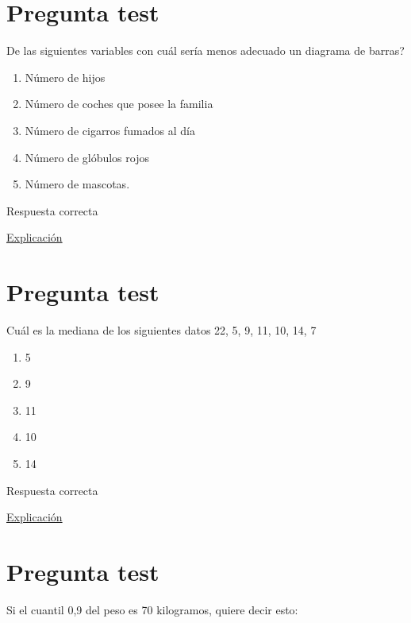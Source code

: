 \documentclass[
]{book}
\providecommand{\tightlist}{%
  \setlength{\itemsep}{0pt}\setlength{\parskip}{0pt}}
\begin{document}
\hypertarget{pregunta-test-89}{%
\section{Pregunta test}\label{pregunta-test-89}}

De las siguientes variables con cuál sería menos adecuado un diagrama de barras?

\begin{enumerate}
\def\labelenumi{\alph{enumi})}
\tightlist
\item
  Número de hijos
\item
  Número de coches que posee la familia
\item
  Número de cigarros fumados al día
\item
  Número de glóbulos rojos
\item
  Número de mascotas.
\end{enumerate}

Respuesta correcta

\href{https://1fjmanzano.github.io/bioestadistica/representaciones-gra\%CC\%81ficas.html}{Explicación}

\hypertarget{pregunta-test-90}{%
\section{Pregunta test}\label{pregunta-test-90}}

Cuál es la mediana de los siguientes datos 22, 5, 9, 11, 10, 14, 7

\begin{enumerate}
\def\labelenumi{\alph{enumi})}
\tightlist
\item
  5
\item
  9
\item
  11
\item
  10
\item
  14
\end{enumerate}

Respuesta correcta

\href{https://1fjmanzano.github.io/bioestadistica/medidas-de-posicio\%CC\%81n-dispersio\%CC\%81n-y-forma.html\#medidas-de-posicio\%CC\%81n-centrales}{Explicación}

\hypertarget{pregunta-test-91}{%
\section{Pregunta test}\label{pregunta-test-91}}

Si el cuantil 0,9 del peso es 70 kilogramos, quiere decir esto:
\end{document}
